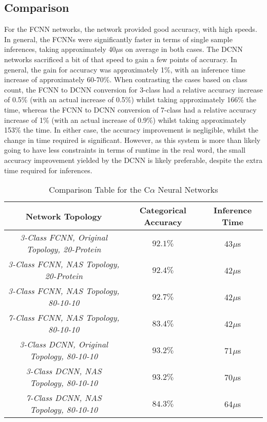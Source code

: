 \documentclass[12pt,letterpaper,oneside,reqno]{book}
\theoremstyle{plain}
\theoremstyle{definition}
\theoremstyle{plain}
\theoremstyle{remark}
\theoremstyle{plain}
\theoremstyle{definition}
\theoremstyle{plain}
\begin{document}
\subsection{Comparison}
For the FCNN networks, the network provided good accuracy, with high speeds. In general, the FCNNs were significantly faster in terms of single sample inferences, taking approximately 40$\mu$s on average in both cases. The DCNN networks sacrificed a bit of that speed to gain a few points of accuracy. In general, the gain for accuracy was approximately 1\%, with an inference time increase of approximately 60-70\%. When contrasting the cases based on class count, the FCNN to DCNN conversion for 3-class had a relative accuracy increase of 0.5\% (with an actual increase of 0.5\%) whilst taking approximately 166\% the time, whereas the FCNN to DCNN conversion of 7-class had a relative accuracy increase of 1\% (with an actual increase of 0.9\%) whilst taking approximately 153\% the time. In either case, the accuracy improvement is negligible, whilst the change in time required is significant. However, as this system is more than likely going to have less constraints in terms of runtime in the real word, the small accuracy improvement yielded by the DCNN is likely preferable, despite the extra time required for inferences.
\begin{table}[H]
\centering
		\begin{tabular}{|c|c|c|}
				\hline
			    \textbf{Network Topology} & \textbf{Categorical Accuracy} & \textbf{Inference Time} \\
				\hline
				\textit{3-Class FCNN, Original Topology, 20-Protein} & $92.1\%$ & 43$\mu$s \\
				\hline
				\textit{3-Class FCNN, NAS Topology, 20-Protein} & $92.4\%$ & 42$\mu$s \\
				\hline
				\textit{3-Class FCNN, NAS Topology, 80-10-10} & $92.7\%$ & 42$\mu$s \\
				\hline
				\textit{7-Class FCNN, NAS Topology, 80-10-10} & $83.4\%$ & 42$\mu$s \\
				\hline
				\textit{3-Class DCNN, Original Topology, 80-10-10} & $93.2\%$ & 71$\mu$s \\
				\hline
				\textit{3-Class DCNN, NAS Topology, 80-10-10} & $93.2\%$ & 70$\mu$s \\
				\hline
				\textit{7-Class DCNN, NAS Topology, 80-10-10} & $84.3\%$ & 64$\mu$s \\
				\hline
		\end{tabular}
		\caption{Comparison Table for the C$\alpha$ Neural Networks}
		\label{tab:calphacompare}
\end{table}
\end{document}
